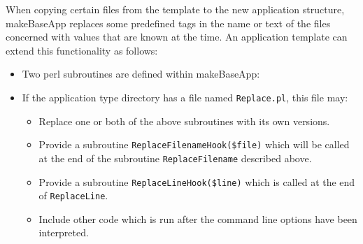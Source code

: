 When copying certain files from the template to the new application structure, makeBaseApp replaces some predefined tags in the name or text of the files concerned with values that are known at the time.
An application template can extend this functionality as follows:

\begin{itemize}
\item Two perl subroutines are defined within makeBaseApp:


\item If the application type directory has a file named \verb|Replace.pl|, this file may:

\begin{itemize}
\item Replace one or both of the above subroutines with its own versions.

\item Provide a subroutine \verb|ReplaceFilenameHook($file)| which will be called at the end of the subroutine \verb|ReplaceFilename| described above.

\item Provide a subroutine \verb|ReplaceLineHook($line)| which is called at the end of \verb|ReplaceLine|.

\item Include other code which is run after the command line options have been interpreted.
\end{itemize}
\end{itemize}


